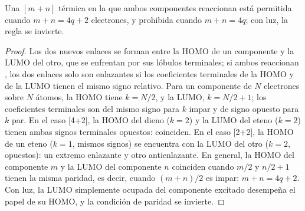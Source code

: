 \begin{theorem}[Cicloadiciones]\label{thm:b3:pericyclic:cycloaddition}
Una  $[m + n]$ térmica en la que ambos componentes reaccionan  está
permitida cuando $m + n = 4q + 2$ electrones, y prohibida cuando $m + n = 4q$; con luz, la
regla se invierte.
\end{theorem}

\begin{proof}
Los dos nuevos enlaces se forman entre la HOMO de un componente y la LUMO del
otro, que se enfrentan por sus lóbulos terminales; si ambos reaccionan
, los dos enlaces solo son enlazantes si los coeficientes terminales de la
HOMO y de la LUMO tienen el mismo signo relativo. Para un componente de $N$
electrones sobre $N$ átomos, la HOMO tiene $k = N/2$, y la LUMO, $k = N/2 + 1$; los coeficientes terminales son del
mismo signo para $k$ impar y de signo opuesto para $k$ par. En el caso [4+2], la HOMO del dieno ($k = 2$)
y la LUMO del eteno ($k = 2$) tienen ambas signos terminales opuestos: coinciden. En el
caso [2+2], la HOMO de un eteno ($k = 1$, mismos signos) se encuentra con la LUMO del otro
($k = 2$, opuestos): un extremo enlazante y otro antienlazante. En general, la HOMO del componente $m$
y la LUMO del componente $n$ coinciden cuando $m/2$ y $n/2 + 1$ tienen la misma
paridad, es decir, cuando $(m + n)/2$ es impar: $m + n = 4q + 2$. Con luz, la LUMO simplemente ocupada del
componente excitado desempeña el papel de su HOMO, y la condición de paridad se
invierte.
\end{proof}

